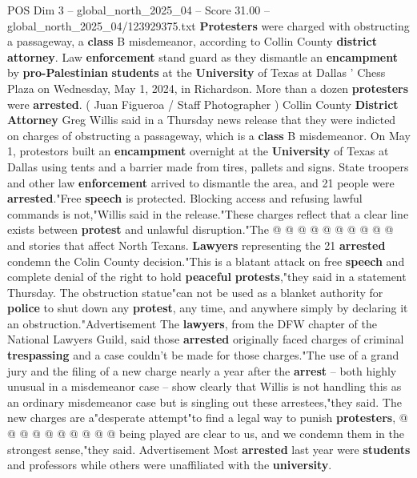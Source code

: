\begin{textsample}{POS Dim 3 – global\_north\_2025\_04 – Score 31.00 – global\_north\_2025\_04/123929375.txt}  \label{ex:f3_pos_056}
\textbf{Protesters} were charged with obstructing a passageway, a \textbf{class} B misdemeanor, according to Collin County \textbf{district} \textbf{attorney}.
Law \textbf{enforcement} stand guard as they dismantle an \textbf{encampment} by \textbf{pro-Palestinian} \textbf{students} at the \textbf{University} of Texas at Dallas ' Chess Plaza on Wednesday, May 1, 2024, in Richardson.
More than a dozen \textbf{protesters} were \textbf{arrested}. ( Juan Figueroa / Staff Photographer ) Collin County \textbf{District} \textbf{Attorney} Greg Willis said in a Thursday news release that they were indicted on charges of obstructing a passageway, which is a \textbf{class} B misdemeanor.
On May 1, protestors built an \textbf{encampment} overnight at the \textbf{University} of Texas at Dallas using tents and a barrier made from tires, pallets and signs.
State troopers and other law \textbf{enforcement} arrived to dismantle the area, and 21 people were \textbf{arrested}."Free \textbf{speech} is protected.
Blocking access and refusing lawful commands is not,"Willis said in the release."These charges reflect that a clear line exists between \textbf{protest} and unlawful disruption."The @ @ @ @ @ @ @ @ @ @ and stories that affect North Texans. \textbf{Lawyers} representing the 21 \textbf{arrested} condemn the Colin County decision."This is a blatant attack on free \textbf{speech} and complete denial of the right to hold \textbf{peaceful} \textbf{protests},"they said in a statement Thursday.
The obstruction statue"can not be used as a blanket authority for \textbf{police} to shut down any \textbf{protest}, any time, and anywhere simply by declaring it an obstruction."Advertisement The \textbf{lawyers}, from the DFW chapter of the National Lawyers Guild, said those \textbf{arrested} originally faced charges of criminal \textbf{trespassing} and a case couldn't be made for those charges."The use of a grand jury and the filing of a new charge nearly a year after the \textbf{arrest} -- both highly unusual in a misdemeanor case -- show clearly that Willis is not handling this as an ordinary misdemeanor case but is singling out these arrestees,"they said.
The new charges are a"desperate attempt"to find a legal way to punish \textbf{protesters}, @ @ @ @ @ @ @ @ @ @ being played are clear to us, and we condemn them in the strongest sense,"they said.
Advertisement Most \textbf{arrested} last year were \textbf{students} and professors while others were unaffiliated with the \textbf{university}.

\end{textsample}
